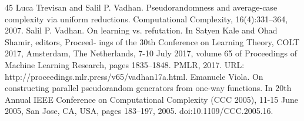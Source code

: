 \begin{thebibliography}{45}
 Luca Trevisan and Salil P. Vadhan. Pseudorandomness and average-case complexity via uniform reductions. Computational Complexity, 16(4):331–364, 2007.
 Salil P. Vadhan. On learning vs. refutation. In Satyen Kale and Ohad Shamir, editors, Proceed- ings of the 30th Conference on Learning Theory, COLT 2017, Amsterdam, The Netherlands, 7-10 July 2017, volume 65 of Proceedings of Machine Learning Research, pages 1835–1848. PMLR, 2017. URL: http://proceedings.mlr.press/v65/vadhan17a.html.
 Emanuele Viola. On constructing parallel pseudorandom generators from one-way functions. In 20th Annual IEEE Conference on Computational Complexity (CCC 2005), 11-15 June 2005, San Jose, CA, USA, pages 183–197, 2005. doi:10.1109/CCC.2005.16.
\end{thebibliography}

